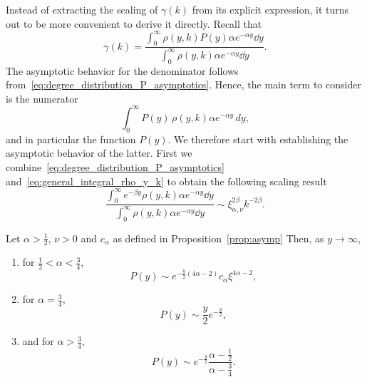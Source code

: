 Instead of extracting the scaling of $\gamma(k)$ from its explicit expression, it turns out to be more convenient to derive it directly. Recall that
\[
	\gamma(k) = \frac{\int_0^\infty \rho(y,k) P(y) \alpha e^{-\alpha y} \dd y}{\int_0^\infty \rho(y,k) \alpha e^{-\alpha y} \dd y}.
\]
The asymptotic behavior for the denominator follows from~\eqref{eq:degree_distribution_P_asymptotics}. Hence, the main term to consider is the numerator
\[
	\int_0^{\infty} P(y) \, \rho(y,k) \alpha e^{-\alpha y} \, dy,
\]
and in particular the function $P(y)$. We therefore start with establishing the asymptotic behavior of the latter. First we combine~\eqref{eq:degree_distribution_P_asymptotics} and~\eqref{eq:general_integral_rho_y_k} to obtain the following scaling result
\begin{equation}\label{eq:general_clustering_integral_scaling}
	\frac{\int_0^\infty e^{-\beta y} \rho(y,k) \alpha e^{-\alpha y} \dd y}
	{\int_0^\infty \rho(y,k) \alpha e^{-\alpha y} \dd y}
	\sim \xi_{\alpha, \nu}^{2\beta} k^{-2\beta}.
\end{equation}



\begin{proposition}\label{prop:asymptotics_P}
Let $\alpha > \frac{1}{2}$, $\nu > 0$ and $c_\alpha$ as defined in Proposition~\ref{prop:asymp} Then, as $y \to \infty$, 
\begin{enumerate}
\item for $\frac{1}{2} < \alpha < \frac{3}{4}$,
\[
	P(y) \sim e^{-\frac{y}{2}(4\alpha - 2)} c_\alpha \xi^{4\alpha - 2},
\]
\item for $\alpha = \frac{3}{4}$,
\[
	P(y) \sim \frac{y}{2} e^{-\frac{y}{2}},
\]
\item and for $\alpha > \frac{3}{4}$,
\[
	P(y) \sim e^{-\frac{y}{2}} \frac{\alpha - \frac{1}{2}}{\alpha - \frac{3}{4}}.
\]
\end{enumerate}
\end{proposition}

